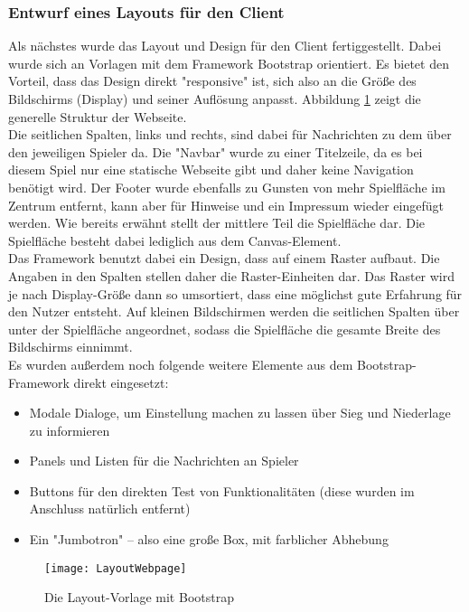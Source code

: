 \subsubsection{Entwurf eines Layouts für den Client}

Als nächstes wurde das Layout und Design für den Client fertiggestellt. Dabei wurde sich an Vorlagen mit dem Framework Bootstrap orientiert. Es bietet den Vorteil, dass das Design direkt "responsive" ist, sich also an die Größe des Bildschirms (Display) und seiner Auflösung anpasst. Abbildung \ref{fig:layoutWebpage} zeigt die generelle Struktur der Webseite.\\
Die seitlichen Spalten, links und rechts, sind dabei für Nachrichten zu dem \bzw über den jeweiligen Spieler da. Die "Navbar" wurde zu einer Titelzeile, da es bei diesem Spiel nur eine statische Webseite gibt und daher keine Navigation benötigt wird. Der Footer wurde ebenfalls zu Gunsten von mehr Spielfläche im Zentrum entfernt, kann aber für Hinweise und ein Impressum wieder eingefügt werden. Wie bereits erwähnt stellt der mittlere Teil die Spielfläche dar. Die Spielfläche besteht dabei lediglich aus dem Canvas-Element.\\
Das Framework benutzt dabei ein Design, dass auf einem Raster aufbaut. Die Angaben in den Spalten stellen daher die Raster-Einheiten dar. Das Raster wird je nach Display-Größe dann so umsortiert, dass eine möglichst gute Erfahrung für den Nutzer entsteht. Auf kleinen Bildschirmen werden die seitlichen Spalten über \bzw unter der Spielfläche angeordnet, sodass die Spielfläche die gesamte Breite des Bildschirms einnimmt.\\
Es wurden außerdem noch folgende weitere Elemente aus dem Bootstrap-Framework direkt eingesetzt:

\begin{itemize}
	\item Modale Dialoge, um Einstellung machen zu lassen \bzw über Sieg und Niederlage zu informieren
	\item Panels und Listen für die Nachrichten an Spieler
	\item Buttons für den direkten Test von Funktionalitäten (diese wurden im Anschluss natürlich entfernt)
	\item Ein "Jumbotron" -- also eine große Box, mit farblicher Abhebung
\end{itemize}

\clearpage

\begin{figure}[htp]
	\centering
	\captionsetup{justification=centering}
	\texttt{[image: LayoutWebpage]}
	\caption[Layout Webseite]{Die Layout-Vorlage mit Bootstrap\footnotemark}
	\label{fig:layoutWebpage}
\end{figure}

